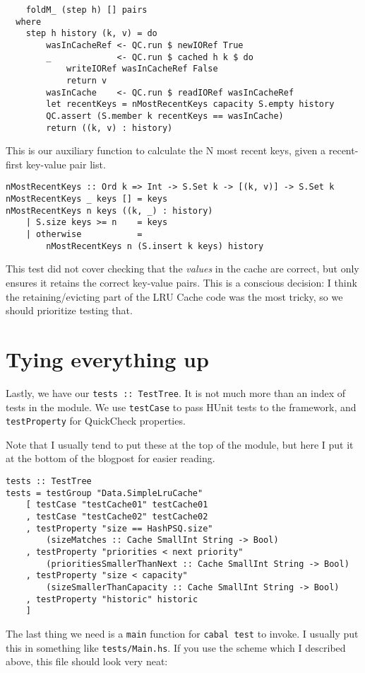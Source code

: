 \begin{verbatim}
    foldM_ (step h) [] pairs
  where
    step h history (k, v) = do
        wasInCacheRef <- QC.run $ newIORef True
        _             <- QC.run $ cached h k $ do
            writeIORef wasInCacheRef False
            return v
        wasInCache    <- QC.run $ readIORef wasInCacheRef
        let recentKeys = nMostRecentKeys capacity S.empty history
        QC.assert (S.member k recentKeys == wasInCache)
        return ((k, v) : history)
\end{verbatim}
This is our auxiliary function to calculate the N most recent keys, given a recent-first key-value pair list.

\begin{verbatim}
nMostRecentKeys :: Ord k => Int -> S.Set k -> [(k, v)] -> S.Set k
nMostRecentKeys _ keys [] = keys
nMostRecentKeys n keys ((k, _) : history)
    | S.size keys >= n    = keys
    | otherwise           =
        nMostRecentKeys n (S.insert k keys) history
\end{verbatim}
This test did not cover checking that the \textit{values} in the cache are correct, but only ensures it retains the correct key-value pairs. This is a conscious decision: I think the retaining/evicting part of the LRU Cache code was the most tricky, so we should prioritize testing that.

\section{Tying everything up}


Lastly, we have our \texttt{tests :: TestTree}. It is not much more than an index of tests in the module. We use \texttt{testCase} to pass HUnit tests to the framework, and \texttt{testProperty} for QuickCheck properties.

Note that I usually tend to put these at the top of the module, but here I put it at the bottom of the blogpost for easier reading.

\begin{verbatim}
tests :: TestTree
tests = testGroup "Data.SimpleLruCache"
    [ testCase "testCache01" testCache01
    , testCase "testCache02" testCache02
    , testProperty "size == HashPSQ.size"
        (sizeMatches :: Cache SmallInt String -> Bool)
    , testProperty "priorities < next priority"
        (prioritiesSmallerThanNext :: Cache SmallInt String -> Bool)
    , testProperty "size < capacity"
        (sizeSmallerThanCapacity :: Cache SmallInt String -> Bool)
    , testProperty "historic" historic
    ]
\end{verbatim}
The last thing we need is a \texttt{main} function for \texttt{cabal test} to invoke. I usually put this in something like \texttt{tests/Main.hs}. If you use the scheme which I described above, this file should look very neat:

